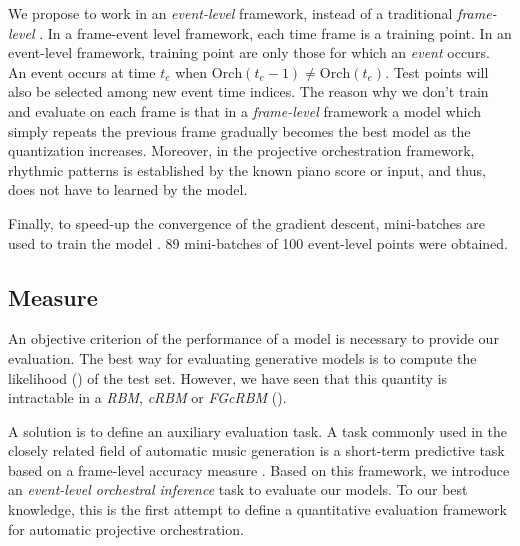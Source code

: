 \documentclass[letterpaper]{article}
\begin{document}
\label{sec:event-level}
We propose to work in an \textit{event-level} framework, instead of a traditional \textit{frame-level} \cite{DBLP:journals/corr/YaoCVDD15,boulanger2012modeling,lavrenko2003polyphonic}. In a frame-event level framework, each time frame is a training point. 
In an event-level framework, training point are only those for which an \textit{event} occurs. An event occurs at time $t_{e}$ when $\text{Orch}(t_{e}-1) \neq \text{Orch}(t_{e})$. Test points will also be selected among new event time indices. The reason why we don't train and evaluate on each frame is that in a \textit{frame-level} framework a model which simply repeats the previous frame gradually becomes the best model as the quantization increases. Moreover, in the projective orchestration framework, rhythmic patterns is established by the known piano score or input, and thus, does not have to learned by the model.

Finally, to speed-up the convergence of the gradient descent, mini-batches are used to train the model \cite{bishop2006pattern}. 89 mini-batches of 100 event-level points were obtained.


\subsection{Measure}
An objective criterion of the performance of a model is necessary to provide our evaluation. 
The best way for evaluating generative models is to compute the likelihood () of the test set. However, we have seen that this quantity is intractable in a \textit{RBM}, \textit{cRBM} or \textit{FGcRBM} ().

A solution is to define an auxiliary evaluation task. A task commonly used in the closely related field of automatic music generation is a short-term predictive task based on a frame-level accuracy measure \cite{DBLP:journals/corr/YaoCVDD15,boulanger2012modeling,lavrenko2003polyphonic}. Based on this framework, we introduce an \textit{event-level orchestral inference} task to evaluate our models. To our best knowledge, this is the first attempt to define a quantitative evaluation framework for automatic projective orchestration.
\end{document}

